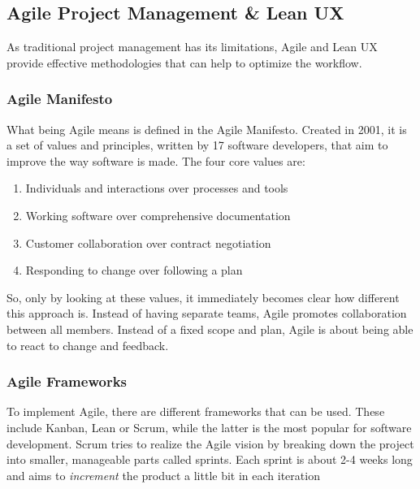 \newpage
\subsection{Agile Project Management \& Lean UX} \label{Agile Project Management & Lean UX}
As traditional project management has its limitations, Agile and Lean UX provide effective
methodologies that can help to optimize the workflow.

\subsubsection{Agile Manifesto}

What being Agile means is defined in the Agile Manifesto. Created in 2001, it is a set of values and
principles, written by 17 software developers, that aim to improve the way software is made. The
four core values are:
\begin{enumerate}
    \item Individuals and interactions over processes and tools
    \item Working software over comprehensive documentation
    \item Customer collaboration over contract negotiation
    \item Responding to change over following a plan
\end{enumerate}

So, only by looking at these values, it immediately becomes clear how different this approach is.
Instead of having separate teams, Agile promotes collaboration between all members. Instead of a
fixed scope and plan, Agile is about being able to react to change and feedback.

\subsubsection{Agile Frameworks}
To implement Agile, there are different frameworks that can be used. These include Kanban, Lean or
Scrum, while the latter is the most popular for software development. Scrum tries to realize the Agile
vision by breaking down the project into smaller, manageable parts called sprints. Each sprint is
about 2-4 weeks long and aims to \textit{increment} the product a little bit in each iteration

